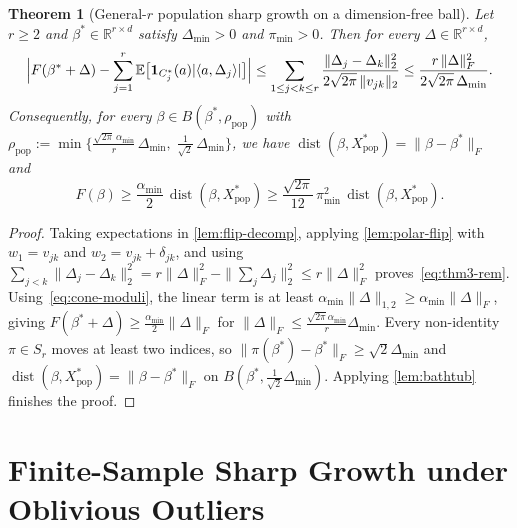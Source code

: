 \documentclass[11pt]{article}
\theoremstyle{plain}
\newtheorem{theorem}{Theorem}[section]
\theoremstyle{remark}
\numberwithin{equation}{section}
\newcommand{\R}{\mathbb{R}}
\newcommand{\E}{\mathbb{E}}
\newcommand{\ind}{\mathbf{1}}
\newcommand{\ip}[2]{\langle #1, #2 \rangle}
\newcommand{\norm}[1]{\|#1\|}
\newcommand{\dist}{\operatorname{dist}}
\newcommand{\Fnorm}[1]{\|#1\|_F}
\newcommand{\Lonenorm}[1]{\|#1\|_{1,2}}
\begin{document}
\begin{theorem}[General-$r$ population sharp growth on a dimension-free ball]
  \label{thm:pop-genr}
  Let $r \ge 2$ and $\beta^* \in \R^{r \times d}$ satisfy $\Delta_{\min} > 0$ and $\pi_{\min} > 0$. Then for every $\Delta \in \R^{r \times d}$,
  \begin{equation}
    \label{eq:thm3-rem}
    \Bigl|F(\beta^* + \Delta) - \sum_{j=1}^r \E\bigl[\ind_{C_j^*}(a)|\ip{a}{\Delta_j}|\bigr]\Bigr|
    \le \sum_{1 \le j < k \le r} \frac{\norm{\Delta_j - \Delta_k}_2^2}{2\sqrt{2\pi}\,\norm{v_{jk}}_2}
    \le \frac{r\,\Fnorm{\Delta}^2}{2\sqrt{2\pi}\,\Delta_{\min}}.
  \end{equation}
  Consequently, for every $\beta \in B(\beta^*, \rho_{\mathrm{pop}})$ with $\rho_{\mathrm{pop}} := \min\bigl\{\frac{\sqrt{2\pi}\,\alpha_{\min}}{r}\,\Delta_{\min},\; \frac{1}{\sqrt{2}}\,\Delta_{\min}\bigr\}$, we have $\dist(\beta, X_{\mathrm{pop}}^*) = \Fnorm{\beta - \beta^*}$ and
  \[
    F(\beta) \ge \frac{\alpha_{\min}}{2}\,\dist(\beta, X_{\mathrm{pop}}^*)
    \ge \frac{\sqrt{2\pi}}{12}\,\pi_{\min}^2\,\dist(\beta, X_{\mathrm{pop}}^*).
  \]
\end{theorem}
\begin{proof}
Taking expectations in \cref{lem:flip-decomp}, applying \cref{lem:polar-flip} with $w_1 = v_{jk}$ and $w_2 = v_{jk} + \delta_{jk}$, and using $\sum_{j < k} \norm{\Delta_j - \Delta_k}_2^2 = r\Fnorm{\Delta}^2 - \norm{\sum_j \Delta_j}_2^2 \le r\Fnorm{\Delta}^2$ proves~\eqref{eq:thm3-rem}. Using~\eqref{eq:cone-moduli}, the linear term is at least $\alpha_{\min}\Lonenorm{\Delta} \ge \alpha_{\min}\Fnorm{\Delta}$, giving $F(\beta^* + \Delta) \ge \frac{\alpha_{\min}}{2}\Fnorm{\Delta}$ for $\Fnorm{\Delta} \le \frac{\sqrt{2\pi}\alpha_{\min}}{r}\Delta_{\min}$. Every non-identity $\pi \in S_r$ moves at least two indices, so $\Fnorm{\pi(\beta^*) - \beta^*} \ge \sqrt{2}\Delta_{\min}$ and $\dist(\beta, X_{\mathrm{pop}}^*) = \Fnorm{\beta - \beta^*}$ on $B(\beta^*, \frac{1}{\sqrt{2}}\Delta_{\min})$. Applying \cref{lem:bathtub} finishes the proof.
\end{proof}

\section{Finite-Sample Sharp Growth under Oblivious Outliers}
\label{sec:finite-sample}
\end{document}
